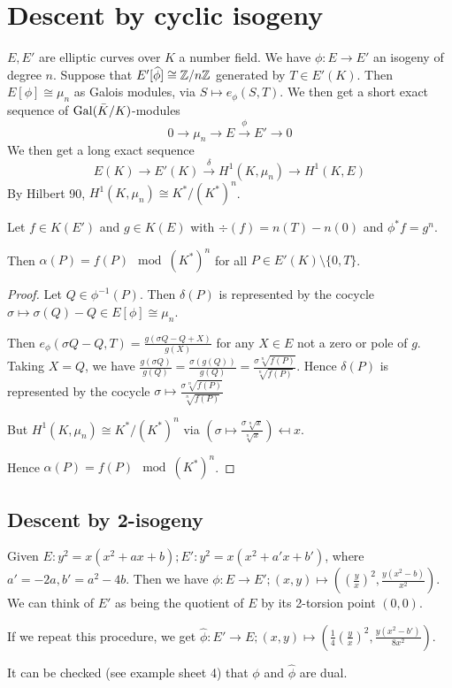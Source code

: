 \documentclass[10pt,a4paper]{article}
\begin{document}
\section{Descent by cyclic isogeny}
$E, E'$ are elliptic curves over $K$ a number field. We have $\phi:E \to E'$ an isogeny of degree $n$. Suppose that $E'[\widehat{\phi}]\cong \mathbb{Z}/n\mathbb{Z}$ generated by $T\in E'(K)$. Then $E[\phi] \cong \mu_n$ as Galois modules, via $S \mapsto e_\phi(S,T)$. We then get a short exact sequence of $\operatorname{Gal}(\bar{K}/K)$-modules
\[0 \to \mu_n \to E \xrightarrow{\phi} E' \to 0\]
We then get a long exact sequence
\[E(K) \to E'(K) \xrightarrow{\delta} H^1(K, \mu_n) \to H^1(K, E)\]
By Hilbert 90, $H^1(K, \mu_n) \cong K^\ast/(K^\ast)^n$.
\begin{theorem}
  Let $f \in K(E')$ and $g \in K(E)$ with $\div(f) = n(T) - n(0)$ and $\phi^\ast f = g^n$.

  Then $\alpha(P) = f(P) \mod (K^\ast)^n$ for all $P \in E'(K)\setminus \{0, T\}$.
\end{theorem}
\begin{proof}
  Let $Q \in \phi^{-1}(P)$. Then $\delta(P)$ is represented by the cocycle $\sigma \mapsto \sigma(Q) -Q \in E[\phi] \cong \mu_n$.

  Then $e_\phi(\sigma Q-Q, T) = \frac{g(\sigma Q-Q+X)}{g(X)}$ for any $X \in E$ not a zero or pole of $g$. Taking $X=Q$, we have $\frac{g(\sigma Q)}{g(Q)} = \frac{\sigma(g(Q))}{g(Q)} = \frac{\sigma\sqrt[n]{f(P)}}{\sqrt[n]{f(P)}}$. Hence $\delta(P)$ is represented by the cocycle $\sigma \mapsto \frac{\sigma\sqrt[n]{f(P)}}{\sqrt[n]{f(P)}}$

  But $H^1(K, \mu_n) \cong K^\ast/(K^\ast)^n$ via $(\sigma \mapsto \frac{\sigma \sqrt[n]{x}}{\sqrt[n]{x}})\mapsfrom x$.

  Hence $\alpha(P) = f(P) \mod (K^\ast)^n$.
\end{proof}
\subsection{Descent by 2-isogeny}
Given $E: y^2=x(x^2+ax+b); E':y^2 = x(x^2+a'x+b')$, where $a'=-2a, b'=a^2-4b$. Then we have $\phi:E \to E'; (x,y) \mapsto \left(\left(\frac{y}{x}\right)^2, \frac{y(x^2-b)}{x^2}\right)$. We can think of $E'$ as being the quotient of $E$ by its 2-torsion point $(0,0)$.

If we repeat this procedure, we get $\hat{\phi}: E' \to E; (x,y) \mapsto \left(\frac{1}{4}\left(\frac{y}{x}\right)^2, \frac{y(x^2-b')}{8x^2}\right)$.

It can be checked (see example sheet 4) that $\phi$ and $\hat{\phi}$ are dual.
\end{document}

